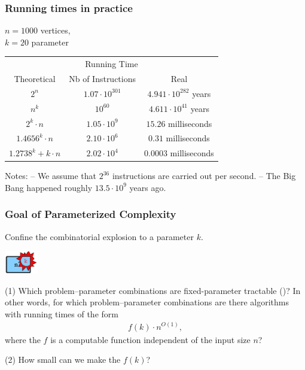 \begin{frame}
  \frametitle{Running times in practice}
  \noindent
  $n = 1000$ vertices,\\
  $k = 20$ parameter\\
  \bigskip
  
  \begin{tabular}{c c c}
   \hline
   \multicolumn{3}{c}{Running Time}\\
   Theoretical & Nb of Instructions & Real\\
   \hline
   $2^n$ & $1.07 \cdot 10^{301}$ & $4.941 \cdot 10^{282}$ years\\
   $n^k$ & $10^{60}$  & $4.611 \cdot 10^{41}$  years\\
   $2^k \cdot n$ & $1.05 \cdot 10^9$ & $15.26$ milliseconds\\
   $1.4656^k \cdot n$ & $2.10 \cdot 10^6$ & $0.31$ milliseconds\\
   $1.2738^k + k\cdot n$ & $2.02 \cdot 10^4$ & $0.0003$ milliseconds\\
   \hline
  \end{tabular}

  \bigskip
  \noindent
  Notes:\newline
  -- We assume that $2^{36}$ instructions are carried out per second.\newline
  -- The Big Bang happened roughly $13.5\cdot 10^9$ years ago.
\end{frame}

\begin{frame}
 \frametitle{Goal of Parameterized Complexity}

 \noindent
 Confine the combinatorial explosion to a parameter $k$.\\
 \smallskip

 \begin{center}
  \includegraphics[height=1cm]{../img/pc.jpg}
 \end{center}

 \smallskip
 \noindent
 (1) Which problem--parameter combinations are fixed-parameter tractable (\FPT)? In other words, for which problem--parameter combinations are there algorithms with running times of the form
 \begin{align*}
  f(k) \cdot n^{O(1)},
 \end{align*}
 where the $f$ is a computable function independent of the input size $n$?
 
 \smallskip
 \noindent
 (2) How small can we make the $f(k)$?

\end{frame}


